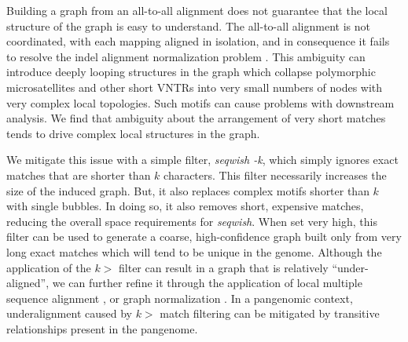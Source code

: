 \documentclass{bioinfo}
\theoremstyle{definition}
\newcommand{\red}[1]{{\textcolor{Red}{#1}}}
\newcommand{\FIXME}[1]{\red{[FIXME: #1]}}
\begin{document}
Building a graph from an all-to-all alignment does not guarantee that the local structure of the graph is easy to understand.
The all-to-all alignment is not coordinated, with each mapping aligned in isolation, and in consequence it fails to resolve the indel alignment normalization problem \citep{Mose_2019}.
This ambiguity can introduce deeply looping structures in the graph which collapse polymorphic microsatellites and other short VNTRs into very small numbers of nodes with very complex local topologies.
Such motifs can cause problems with downstream analysis.
We find that ambiguity about the arrangement of very short matches tends to drive complex local structures in the graph.

We mitigate this issue with a simple filter, \textit{seqwish -k}, which simply ignores exact matches that are shorter than $k$ characters.
This filter necessarily increases the size of the induced graph.
But, it also replaces complex motifs shorter than $k$ with single bubbles.
In doing so, it also removes short, expensive matches, reducing the overall space requirements for \textit{seqwish}.
When set very high, this filter can be used to generate a coarse, high-confidence graph built only from very long exact matches which will tend to be unique in the genome.
Although the application of the $k>$ filter can result in a graph that is relatively ``under-aligned'', we can further refine it through the application of local multiple sequence alignment \citep{Gao_2020}, or graph normalization \citep{Doerr_2021}.
In a pangenomic context, underalignment caused by $k>$ match filtering can be mitigated by transitive relationships present in the pangenome.



\end{document}

